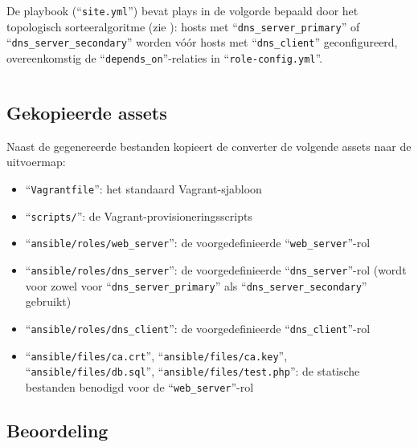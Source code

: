 De playbook (``\texttt{site.yml}'') bevat plays in de volgorde bepaald door het topologisch sorteeralgoritme (zie ): hosts met ``\texttt{dns\_server\_primary}'' of ``\texttt{dns\_server\_secondary}'' worden vóór hosts met ``\texttt{dns\_client}'' geconfigureerd, overeenkomstig de ``\texttt{depends\_on}''-relaties in ``\texttt{role-config.yml}''.

\begin{codeblock}
    \inputminted{yaml}{../plantuml/output/infra_auto_lab_2_env/ansible/site.yml}
    \caption[Gegenereerde ``\texttt{site.yml}'' voor testcase 2]{De door de converter gegenereerde ``\texttt{site.yml}'' voor testcase 2 (\emph{Infrastructure Automation}, labo 2).}
    \label{code:site_infra_auto_lab2}
\end{codeblock}

\subsection{Gekopieerde assets}%
\label{subsec:testcase2_assets}

Naast de gegenereerde bestanden kopieert de converter de volgende assets naar de uitvoermap:

\begin{itemize}
\item ``\texttt{Vagrantfile}'': het standaard Vagrant-sjabloon
\item ``\texttt{scripts/}'': de Vagrant-provisioneringsscripts
\item ``\texttt{ansible/roles/web\_server}'': de voorgedefinieerde ``\texttt{web\_server}''-rol
\item ``\texttt{ansible/roles/dns\_server}'': de voorgedefinieerde ``\texttt{dns\_server}''-rol (wordt voor zowel voor ``\texttt{dns\_server\_primary}'' als ``\texttt{dns\_server\_secondary}'' gebruikt)
\item ``\texttt{ansible/roles/dns\_client}'': de voorgedefinieerde ``\texttt{dns\_client}''-rol
\item ``\texttt{ansible/files/ca.crt}'', ``\texttt{ansible/files/ca.key}'', \\``\texttt{ansible/files/db.sql}'', ``\texttt{ansible/files/test.php}'': de statische bestanden benodigd voor de ``\texttt{web\_server}''-rol
\end{itemize}

\subsection{Beoordeling}%
\label{subsec:testcase2_beoordeling}

